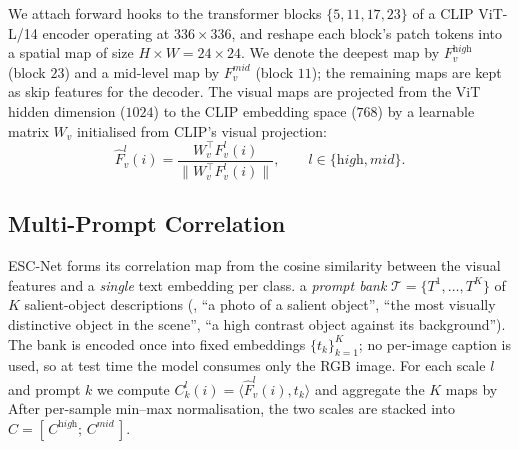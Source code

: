 We attach forward hooks to the transformer blocks $\{5, 11, 17, 23\}$ of a CLIP
ViT-L/14 encoder operating at $336 \times 336$, and reshape each block's patch
tokens into a spatial map of size $H \times W = 24 \times 24$. We denote the
deepest map by $F_v^{\textit{high}}$ (block $23$) and a mid-level map by
$F_v^{\textit{mid}}$ (block $11$); the remaining maps are kept as skip features for
the decoder. The visual maps are projected from the ViT hidden dimension ($1024$)
to the CLIP embedding space ($768$) by a learnable matrix $W_v$ initialised from
CLIP's visual projection:
\begin{equation}
  \hat{F}_v^{l}(i) = \frac{W_v^{\top} F_v^{l}(i)}{\lVert W_v^{\top} F_v^{l}(i) \rVert},
  \qquad l \in \{\textit{high}, \textit{mid}\}.
\end{equation}



\subsection{Multi-Prompt Correlation}
\label{sec:corr}

ESC-Net forms its correlation map from the cosine similarity between the visual
features and a \emph{single} text embedding per class.  a \emph{prompt bank} $\mathcal{T} = \{T^1, \dots, T^K\}$ of $K$
salient-object descriptions (\eg, ``a photo of a salient object'', ``the most
visually distinctive object in the scene'', ``a high contrast object against its
background''). The bank is encoded once into fixed embeddings $\{t_k\}_{k=1}^{K}$;
no per-image caption is used, so at test time the model consumes only the RGB
image. For each scale $l$ and prompt $k$ we compute
$C_k^{l}(i) = \langle \hat{F}_v^{l}(i), t_k \rangle$ and aggregate the $K$ maps by
 After per-sample min--max normalisation, the
two scales are stacked into $C = [\,C^{\textit{high}};\, C^{\textit{mid}}\,]$.

